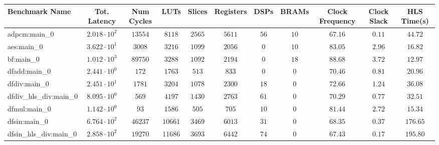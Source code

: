 \begin{tabular}{|l|c|c|c|c|c|c|c|c|c|c|}
\hline
Benchmark Name          & Tot. Latency           & Num Cycles & LUTs      & Slices    & Registers & DSPs    & BRAMs   & Clock Frequency & Clock Slack & HLS Time(s) \\
\hline
adpcm:main\_0           & $ 2.018 \cdot 10^{2} $ & $ 13554  $ & $ 8118  $ & $ 2565  $ & $ 5611  $ & $ 56  $ & $ 10  $ & $ 67.16       $ & $ 0.11    $ & $ 44.72   $ \\
aes:main\_0             & $ 3.622 \cdot 10^{1} $ & $ 3008   $ & $ 3216  $ & $ 1099  $ & $ 2056  $ & $ 0   $ & $ 10  $ & $ 83.05       $ & $ 2.96    $ & $ 16.82   $ \\
bf:main\_0              & $ 1.012 \cdot 10^{3} $ & $ 89750  $ & $ 3288  $ & $ 1092  $ & $ 2194  $ & $ 0   $ & $ 18  $ & $ 88.68       $ & $ 3.72    $ & $ 12.97   $ \\
dfadd:main\_0           & $ 2.441 \cdot 10^{0} $ & $ 172    $ & $ 1763  $ & $ 513   $ & $ 833   $ & $ 0   $ & $ 0   $ & $ 70.46       $ & $ 0.81    $ & $ 20.96   $ \\
dfdiv:main\_0           & $ 2.451 \cdot 10^{1} $ & $ 1781   $ & $ 3204  $ & $ 1078  $ & $ 2300  $ & $ 18  $ & $ 0   $ & $ 72.66       $ & $ 1.24    $ & $ 36.08   $ \\
dfdiv\_hls\_div:main\_0 & $ 8.095 \cdot 10^{0} $ & $ 569    $ & $ 4197  $ & $ 1430  $ & $ 2763  $ & $ 61  $ & $ 0   $ & $ 70.29       $ & $ 0.77    $ & $ 32.51   $ \\
dfmul:main\_0           & $ 1.142 \cdot 10^{0} $ & $ 93     $ & $ 1586  $ & $ 505   $ & $ 705   $ & $ 10  $ & $ 0   $ & $ 81.44       $ & $ 2.72    $ & $ 15.34   $ \\
dfsin:main\_0           & $ 6.764 \cdot 10^{2} $ & $ 46237  $ & $ 10661 $ & $ 3469  $ & $ 6013  $ & $ 31  $ & $ 0   $ & $ 68.35       $ & $ 0.37    $ & $ 176.65  $ \\
dfsin\_hls\_div:main\_0 & $ 2.858 \cdot 10^{2} $ & $ 19270  $ & $ 11686 $ & $ 3693  $ & $ 6442  $ & $ 74  $ & $ 0   $ & $ 67.43       $ & $ 0.17    $ & $ 195.80  $ \\

\end{tabular}
